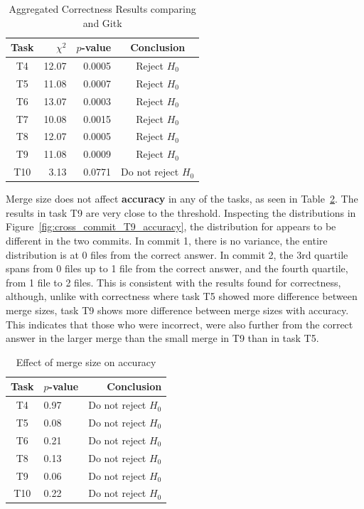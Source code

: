\begin{table}[htpb]
  \centering
  \caption{Aggregated Correctness Results comparing \tool{} and Gitk}
  \label{tab:mcnemar_test_results}
  \begin{tabular}{crrc}
    \toprule
    Task & $\chi^2$ & $p$-value & Conclusion\\\midrule
    T4   & 12.07    & 0.0005    & Reject $H_0$\\
    T5   & 11.08    & 0.0007    & Reject $H_0$\\
    T6   & 13.07    & 0.0003    & Reject $H_0$\\
    T7   & 10.08    & 0.0015    & Reject $H_0$\\
    T8   & 12.07    & 0.0005    & Reject $H_0$\\
    T9   & 11.08    & 0.0009    & Reject $H_0$\\
    T10  & 3.13     & 0.0771    & Do not reject $H_0$\\
    \bottomrule
  \end{tabular}
\end{table}

Merge size does not affect \textbf{accuracy} in any of the tasks, as
seen in Table~\ref{tab:cross_commit_accuracy}. The results in task T9
are very close to the threshold. Inspecting the distributions in
Figure~\ref{fig:cross_commit_T9_accuracy}, the distribution for \tool{}
appears to be different in the two commits. In commit 1, there is no
variance, the entire distribution is at 0 files from the correct answer.
In commit 2, the 3rd quartile spans from 0 files up to 1 file from the
correct answer, and the fourth quartile, from 1 file to 2 files. This is
consistent with the results found for correctness, although, unlike with
correctness where task T5 showed more difference between merge sizes,
task T9 shows more difference between merge sizes with accuracy. This
indicates that those who were incorrect, were also further from the
correct answer in the larger merge than the small merge in T9 than in
task T5.

\begin{table}[htpb]
  \centering
  \caption{Effect of merge size on accuracy}
  \label{tab:cross_commit_accuracy}
  \begin{tabular}{clr}
    \toprule
    Task & $p$-value & Conclusion\\\midrule
    T4   & 0.97      & Do not reject $H_0$\\
    T5   & 0.08      & Do not reject $H_0$\\
    T6   & 0.21      & Do not reject $H_0$\\
    T8   & 0.13      & Do not reject $H_0$\\
    T9   & 0.06      & Do not reject $H_0$\\
    T10  & 0.22      & Do not reject $H_0$\\
    \bottomrule
  \end{tabular}
\end{table}

